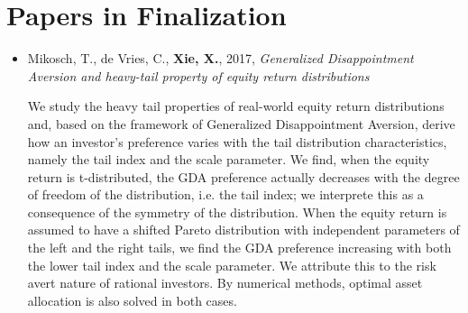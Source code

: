 \documentclass[a4paper]{twentysecondcv} %
\begin{document}
\section{Papers in Finalization}
\begin{itemize}
\item Mikosch, T., de Vries, C., {\bf Xie, X.}, 2017,
  {\it Generalized Disappointment Aversion and heavy-tail property of
    equity return distributions}

  {\small
    We study the heavy tail properties of real-world equity return
    distributions and, based on the framework of Generalized
    Disappointment Aversion, derive how an investor's preference varies
    with the tail distribution characteristics, namely the tail index and
    the scale parameter. We find, when the equity return is t-distributed,
    the GDA preference actually decreases with the degree of freedom of
    the distribution, i.e. the tail index; we interprete this as a
    consequence of the symmetry of the distribution. When the equity
    return is assumed to have a shifted Pareto distribution with
    independent parameters of the left and the right tails, we find the
    GDA preference increasing with both the lower tail index and the scale
    parameter. We attribute this to the risk avert nature of rational
    investors. By numerical methods, optimal asset allocation is also
    solved in both cases.
  }
\end{itemize}




\end{document}
